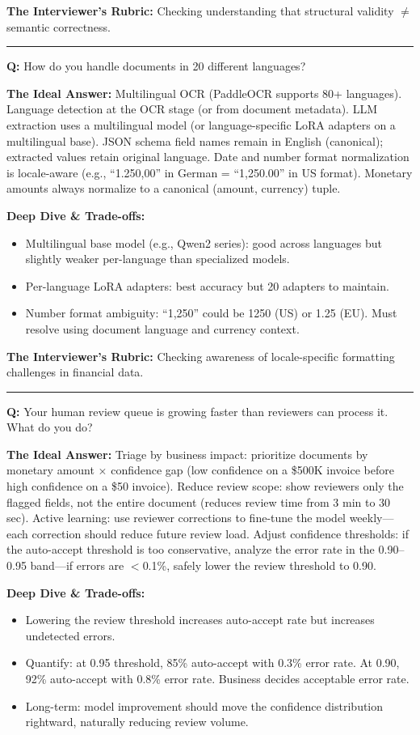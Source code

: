 \textbf{The Interviewer's Rubric:} Checking understanding that structural validity $\neq$ semantic correctness.

\bigskip\hrule\bigskip

\textbf{Q:} How do you handle documents in 20 different languages?

\textbf{The Ideal Answer:} Multilingual OCR (PaddleOCR supports 80+ languages). Language detection at the OCR stage (or from document metadata). LLM extraction uses a multilingual model (or language-specific LoRA adapters on a multilingual base). JSON schema field names remain in English (canonical); extracted values retain original language. Date and number format normalization is locale-aware (e.g., ``1.250,00'' in German = ``1,250.00'' in US format). Monetary amounts always normalize to a canonical (amount, currency) tuple.

\textbf{Deep Dive \& Trade-offs:}
\begin{itemize}
  \item Multilingual base model (e.g., Qwen2 series): good across languages but slightly weaker per-language than specialized models.
  \item Per-language LoRA adapters: best accuracy but 20 adapters to maintain.
  \item Number format ambiguity: ``1,250'' could be 1250 (US) or 1.25 (EU). Must resolve using document language and currency context.
\end{itemize}

\textbf{The Interviewer's Rubric:} Checking awareness of locale-specific formatting challenges in financial data.

\bigskip\hrule\bigskip

\textbf{Q:} Your human review queue is growing faster than reviewers can process it. What do you do?

\textbf{The Ideal Answer:} Triage by business impact: prioritize documents by monetary amount $\times$ confidence gap (low confidence on a \$500K invoice before high confidence on a \$50 invoice). Reduce review scope: show reviewers only the flagged fields, not the entire document (reduces review time from 3 min to 30 sec). Active learning: use reviewer corrections to fine-tune the model weekly---each correction should reduce future review load. Adjust confidence thresholds: if the auto-accept threshold is too conservative, analyze the error rate in the 0.90--0.95 band---if errors are $<$0.1\%, safely lower the review threshold to 0.90.

\textbf{Deep Dive \& Trade-offs:}
\begin{itemize}
  \item Lowering the review threshold increases auto-accept rate but increases undetected errors.
  \item Quantify: at 0.95 threshold, 85\% auto-accept with 0.3\% error rate. At 0.90, 92\% auto-accept with 0.8\% error rate. Business decides acceptable error rate.
  \item Long-term: model improvement should move the confidence distribution rightward, naturally reducing review volume.
\end{itemize}

